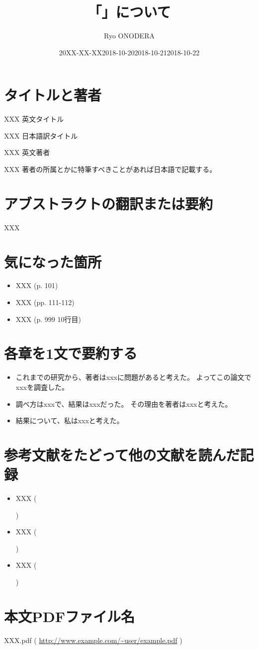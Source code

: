 \documentclass[a4j]{jsarticle}
\title{「」について}
\author[1]{Ryo ONODERA}
\affil[1]{tetera.org}
\date{20XX-XX-XX}
\begin{document}

\maketitle


\section{タイトルと著者}
XXX 英文タイトル
~\cite{example}

XXX 日本語訳タイトル

XXX 英文著者

XXX 著者の所属とかに特筆すべきことがあれば日本語で記載する。

\section{アブストラクトの翻訳または要約}
XXX


\section{気になった箇所}
\begin{itemize}
\item
  XXX (p. 101)
\item
  XXX (pp. 111-112)
\item
  XXX (p. 999 10行目)
\end{itemize}


\section{各章を1文で要約する}
\begin{itemize}
\item
  これまでの研究から、著者はxxxに問題があると考えた。
  よってこの論文でxxxを調査した。
\item
  調べ方はxxxで、結果はxxxだった。
  その理由を著者はxxxと考えた。
\item
  結果について、私はxxxと考えた。
\end{itemize}


\section{参考文献をたどって他の文献を読んだ記録}
\begin{itemize}
\item
  XXX (\date{2018-10-20})
  ~\cite{example-webpage}
\item
  XXX (\date{2018-10-21})
  ~\cite{example-webpage}
\item
  XXX (\date{2018-10-22})
  ~\cite{example-webpage}
\end{itemize}


\section{本文PDFファイル名}
XXX.pdf
(
\url{http://www.example.com/~user/example.pdf}
)


\end{document}
